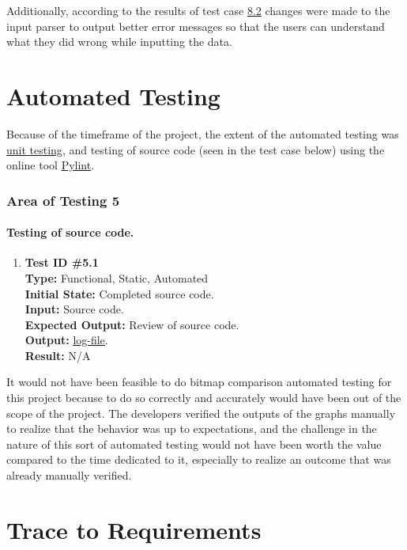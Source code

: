 \documentclass[12pt, titlepage]{article}
\begin{document}
Additionally, according to the results of test case \hyperref[sec:8.2]{8.2} changes were made to the input parser to output better error messages so that the users can understand what they did wrong while inputting the data.
\section{Automated Testing}
Because of the timeframe of the project, the extent of the automated testing was \hyperref[sec:unittest]{unit testing}, and testing of source code (seen in the test case below) using the online tool \href{https://www.pylint.org}{Pylint}.



\subsubsection{Area of Testing 5}		
	\paragraph{Testing of source code.}
		\begin{enumerate}
			\item{\textbf{Test ID \#5.1\\}}
			\textbf{Type:} Functional, Static, Automated\\
			\textbf{Initial State:} Completed source code. \\
			\textbf{Input:} Source code.\\
			\textbf{Expected Output:} Review of source code.\\
			\textbf{Output:}	 \href{run:code_eval.txt} {\underline{log-file}}.\\
			\textbf{Result:} N/A
		\end{enumerate}

It would not have been feasible to do bitmap comparison automated testing for this project because to do so correctly and accurately would have been out of the scope of the project. The developers verified the outputs of the graphs manually to realize that the behavior was up to expectations, and the challenge in the nature of this sort of automated testing would not have been worth the value compared to the time dedicated to it, especially to realize an outcome that was already manually verified.



\section{Trace to Requirements} %
\end{document}
